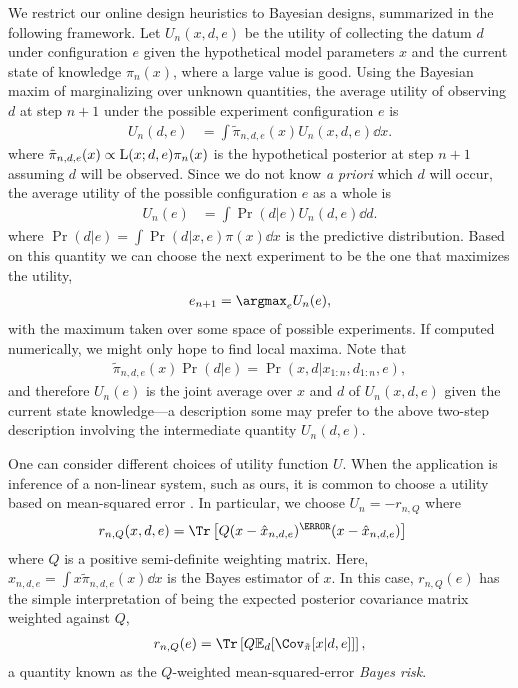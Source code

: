 \documentclass[aps,nofootinbib,twocolumn,superscriptaddress]{revtex4}
\newcommand{\mps}{x}
\newcommand{\eps}{e}
\newcommand{\data}{d}
\begin{document}
We restrict our online design heuristics to Bayesian designs,
summarized in the following framework.
Let $U_n(\mps,\data,\eps)$ be the utility of collecting the datum
$\data$ under configuration $\eps$ given the hypothetical
model parameters $\mps$ and the current state of knowledge $\pi_n(\mps)$,
where a large value is good.
Using the Bayesian maxim of marginalizing over unknown quantities,
the average utility of observing $\data$ at step $n+1$ under
the possible experiment configuration $\eps$ is
\begin{align}
    U_n(\data,\eps)
        &= \int \tilde{\pi}_{n,\data,\eps}(\mps)U_n(\mps,\data,\eps)\dd\mps.
\label{eq:future-utility}
\end{align}
where
$\tilde{\pi}_{n,\data,\eps}(\mps)\propto \Lhood(\mps;\data,\eps)\pi_n(\mps)$
is the hypothetical posterior at step $n+1$ assuming $\data$ will be observed.
Since we do not know \textit{a priori} which $\data$ will
occur, the average utility of the possible configuration $\eps$ as a whole is
\begin{align}
    U_n(\eps)
        &= \int\Pr(\data|\eps) U_n(\data,\eps) \dd\data.
\label{eq:average-utility}
\end{align}
where $\Pr(\data|\eps)=\int \Pr(d|x,e)\pi(x)\dd x$ is the predictive
distribution.
Based on this quantity we can choose the next experiment to be
the one that maximizes the utility,
\begin{align}
    \eps_{n+1} = \argmax_\eps U_n(\eps),
\end{align}
with the maximum taken over some space of possible experiments.
If computed numerically, we might only hope to find local maxima.
Note that
\begin{align}
    \tilde{\pi}_{n,\data,\eps}(\mps)\Pr(\data|\eps)
        =\Pr(\mps,\data|\mps_{1:n},\data_{1:n},\eps),
\end{align}
and therefore $U_n(\eps)$ is the joint average over $\mps$ and $\data$ of
$U_n(\mps,\data,\eps)$ given the current state knowledge---a description
some may prefer to the above two-step description involving
the intermediate quantity $U_n(\data,\eps)$.

One can consider different choices of utility function $U$.
When the application is inference of a non-linear system, such as
ours, it is common to choose a utility based on
mean-squared error \cite{chaloner_bayesian_1995}.
In particular, we choose $U_n=-r_{n,Q}$ where
\begin{align}
    r_{n,Q}(\mps,\data,\eps)
        &= \Tr\left[Q(\mps - \hat\mps_{n,\data,\eps})^\T (\mps - \hat\mps_{n,\data,\eps})\right]
\end{align}
where $Q$ is a positive semi-definite weighting matrix.
Here, $\hat{\mps}_{n,\data,\eps}=\int \mps \tilde{\pi}_{n,\data,\eps}(\mps)\dd\mps$
is the Bayes estimator of $\mps$.
In this case, $r_{n,Q}(\eps)$ has the simple interpretation of being the
expected posterior covariance matrix weighted against $Q$,
\begin{align}
    r_{n,Q}(\eps) = \Tr \left[Q\expect_\data[\Cov_{\tilde{\pi}}
        [\mps|\data,\eps]]\right],
    \label{eq:bayes-risk}
\end{align}
a quantity known as the $Q$-weighted
mean-squared-error \textit{Bayes risk}.
\end{document}
